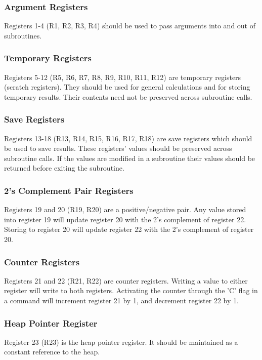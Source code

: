 \documentclass[12pt]{article}
\begin{document}
    \subsubsection{Argument Registers}
        Registers 1-4 (R1, R2, R3, R4) should be used to pass arguments into and out of subroutines.
        
    \subsubsection{Temporary Registers}
        Registers 5-12 (R5, R6, R7, R8, R9, R10, R11, R12) are temporary registers (scratch registers). They should be used for general calculations and for storing temporary results. Their contents need not be preserved across subroutine calls.
        
    \subsubsection{Save Registers}
        Registers 13-18 (R13, R14, R15, R16, R17, R18) are save registers which should be used to save results. These registers' values should be preserved across subroutine calls. If the values are modified in a subroutine their values should be returned before exiting the subroutine.
        
    \subsubsection{2's Complement Pair Registers}
        Registers 19 and 20 (R19, R20) are a positive/negative pair. Any value stored into register 19 will update register 20 with the 2's complement of register 22. Storing to register 20 will update register 22 with the 2's complement of register 20.
        
    \subsubsection{Counter Registers}
        Registers 21 and 22 (R21, R22) are counter registers. Writing a value to either register will write to both registers. Activating the counter through the 'C' flag in a command will increment register 21 by 1, and decrement register 22 by 1.
        
    \subsubsection{Heap Pointer Register}
        Register 23 (R23) is the heap pointer register. It should be maintained as a constant reference to the heap.
        
\end{document}
